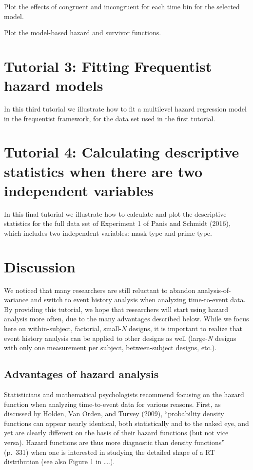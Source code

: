\documentclass[
  man,floatsintext]{apa6}
\begin{document}
Plot the effects of congruent and incongruent for each time bin for the selected model.

Plot the model-based hazard and survivor functions.

\section{Tutorial 3: Fitting Frequentist hazard models}\label{tutorial-3-fitting-frequentist-hazard-models}

In this third tutorial we illustrate how to fit a multilevel hazard regression model in the frequentist framework, for the data set used in the first tutorial.

\section{Tutorial 4: Calculating descriptive statistics when there are two independent variables}\label{tutorial-4-calculating-descriptive-statistics-when-there-are-two-independent-variables}

In this final tutorial we illustrate how to calculate and plot the descriptive statistics for the full data set of Experiment 1 of Panis and Schmidt (2016), which includes two independent variables: mask type and prime type.

\section{Discussion}\label{discussion}

We noticed that many researchers are still reluctant to abandon analysis-of-variance and switch to event history analysis when analyzing time-to-event data. By providing this tutorial, we hope that researchers will start using hazard analysis more often, due to the many advantages described below. While we focus here on within-subject, factorial, small-\emph{N} designs, it is important to realize that event history analysis can be applied to other designs as well (large-\emph{N} designs with only one measurement per subject, between-subject designs, etc.).

\subsection{Advantages of hazard analysis}\label{advantages-of-hazard-analysis}

Statisticians and mathematical psychologists recommend focusing on the hazard function when analyzing time-to-event data for various reasons. First, as discussed by Holden, Van Orden, and Turvey (2009), ``probability density functions can appear nearly identical, both statistically and to the naked eye, and yet are clearly different on the basis of their hazard functions (but not vice versa). Hazard functions are thus more diagnostic than density functions'' (p.~331) when one is interested in studying the detailed shape of a RT distribution (see also Figure 1 in \ldots.).
\end{document}
